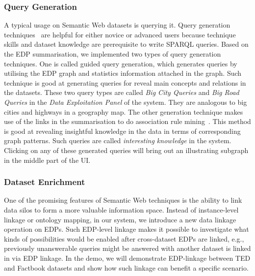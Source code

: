\subsubsection{Query Generation}
A typical usage on Semantic Web datasets is querying it. Query generation techniques~\cite{pan2013query} are helpful for either novice or advanced users because technique skills and dataset knowledge are prerequisite to write SPARQL queries. Based on the EDP summarisation, we implemented two types of query generation techniques. One is called guided query generation, which generates queries by utilising the EDP graph and statistics information attached in the graph. Such technique is good at generating queries for reveal main concepts and relations in the datasets. These two query types are called \emph{Big City Queries} and \emph{Big Road Queries} in the \emph{Data Exploitation Panel} of the system. They are analogous to big cities and highways in a geography map. The other generation technique makes use of the links in the summarisation to do association rule mining~\cite{pan2013query}. This method is good at revealing insightful knowledge in the data in terms of corresponding graph patterns. Such queries are called \emph{interesting knowledge} in the system. Clicking on any of these generated queries will bring out an illustrating subgraph in the middle part of the UI.  
\vspace{-4ex}
\subsubsection{Dataset Enrichment}
One of the promising features of Semantic Web techniques is the ability to link data silos to form a more valuable information space. Instead of instance-level linkage or ontology mapping, in our system, we introduce a new data linkage operation on EDPs. Such EDP-level linkage makes it possible to investigate what kinds of possibilities would be enabled after cross-dataset EDPs are linked, e.g., previously unanswerable queries might be answered with another dataset is linked in via EDP linkage. In the demo, we will demonstrate EDP-linkage between TED and Factbook datasets and show how such linkage can benefit a specific scenario.
